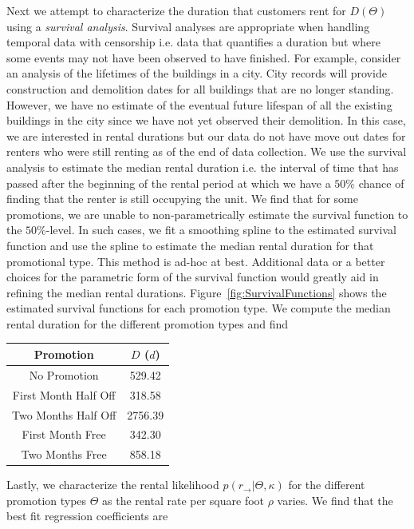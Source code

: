 \documentclass[times]{aastex6}
\begin{document}
Next we attempt to characterize the duration that customers rent for $D(\Theta)$ using a \textit{survival analysis}. Survival analyses are appropriate when handling temporal data with censorship i.e. data that quantifies a duration but where some events may not have been observed to have finished. For example, consider an analysis of the lifetimes of the buildings in a city. City records will provide construction and demolition dates for all buildings that are no longer standing. However, we have no estimate of the eventual future lifespan of all the existing buildings in the city since we have not yet observed their demolition. In this case, we are interested in rental durations but our data do not have move out dates for renters who were still renting as of the end of data collection. We use the survival analysis to estimate the median rental duration i.e. the interval of time that has passed after the beginning of the rental period at which we have a $50 \%$ chance of finding that the renter is still occupying the unit. We find that for some promotions, we are unable to non-parametrically estimate the survival function to the $50 \%$-level. In such cases, we fit a smoothing spline to the estimated survival function and use the spline to estimate the median rental duration for that promotional type. This method is ad-hoc at best. Additional data or a better choices for the parametric form of the survival function would greatly aid in refining the median rental durations. Figure~\ref{fig:SurvivalFunctions} shows the estimated survival functions for each promotion type. We compute the median rental duration for the different promotion types and find

\begin{center}
    \begin{tabular}{ | c | c |}
    \hline
    Promotion & $D$ ($d$) \\ \hline
    No Promotion & 529.42 \\
    First Month Half Off & 318.58 \\
    Two Months Half Off & 2756.39 \\
    First Month Free & 342.30 \\
    Two Months Free & 858.18 \\
    \hline
    \end{tabular}
\end{center}

Lastly, we characterize the rental likelihood $p(r_{\rightarrow} | \Theta, \kappa)$ for the different promotion types $\Theta$ as the rental rate per square foot $\rho$ varies. We find that the best fit regression coefficients are
\end{document}
